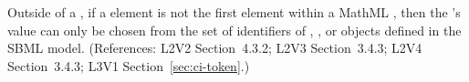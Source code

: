 Outside of a \FunctionDefinition, if a  element is not
the first element within a MathML , then the
's value can only be chosen from the set of identifiers
of \Species, \Compartment, \Parameter or \Reaction objects defined
in the SBML model.  (References: L2V2 Section~4.3.2; L2V3
Section~3.4.3; L2V4 Section~3.4.3; L3V1 Section~\ref{sec:ci-token}.)
